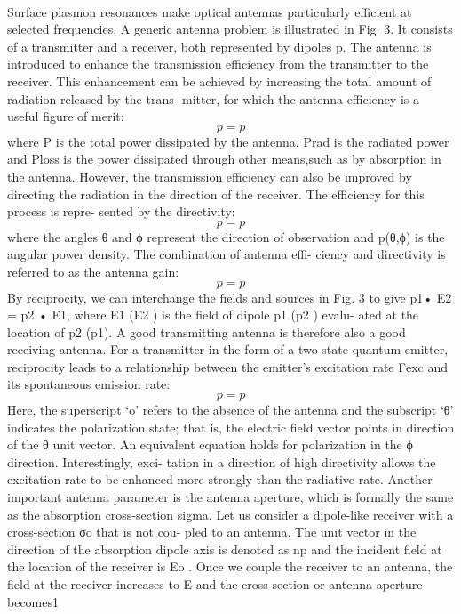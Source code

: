 	\\
	Surface plasmon resonances make optical antennas particularly efficient at selected frequencies. A generic antenna problem is illustrated in Fig. 3. It consists of a transmitter and a receiver, both represented by dipoles p. The antenna is introduced to enhance the transmission efficiency from the transmitter to the receiver. This enhancement can be achieved by increasing the total amount of radiation released by the trans- mitter, for which the antenna efficiency is a useful figure of merit:
	\begin{equation}
		p=p
	\end{equation}
	where P is the total power dissipated by the antenna, Prad is the radiated power and Ploss is the power dissipated through other means,such as by absorption in the antenna. However, the transmission efficiency can also be improved by directing the radiation in the direction of the receiver. The efficiency for this process is repre- sented by the directivity:
	\begin{equation}
		p=p
	\end{equation}
	where the angles θ and ϕ represent the direction of observation and p(θ,ϕ) is the angular power density. The combination of antenna effi- ciency and directivity is referred to as the antenna gain:
	\begin{equation}
		p=p
	\end{equation}
	By reciprocity, we can interchange the fields and sources in Fig. 3 to give p1• E2 = p2 • E1, where E1 (E2 ) is the field of dipole p1 (p2 ) evalu- ated at the location of p2 (p1). A good transmitting antenna is therefore also a good receiving antenna. For a transmitter in the form of a two-state quantum emitter, reciprocity leads to a relationship between the emitter’s excitation rate Γexc and its spontaneous emission rate:
	\begin{equation}
		p=p
	\end{equation}
	Here, the superscript ‘o’ refers to the absence of the antenna and the subscript ‘θ’ indicates the polarization state; that is, the electric field vector points in direction of the θ unit vector. An equivalent equation holds for polarization in the ϕ direction. Interestingly, exci- tation in a direction of high directivity allows the excitation rate to be enhanced more strongly than the radiative rate. Another important antenna parameter is the antenna aperture, which is formally the same as the absorption cross-section sigma. Let us consider a dipole-like receiver with a cross-section σo that is not cou- pled to an antenna. The unit vector in the direction of the absorption dipole axis is denoted as np and the incident field at the location of the receiver is Eo . Once we couple the receiver to an antenna, the field at the receiver increases to E and the cross-section or antenna aperture becomes1
